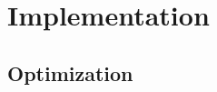 \documentclass[../mthe-493-final-project.tex]{subfiles}
\begin{document}
    \chapter{Implementation}
    \label{ch:implementation}

    \section{Optimization}
    \label{sec:optimization-implementation}







\end{document}
